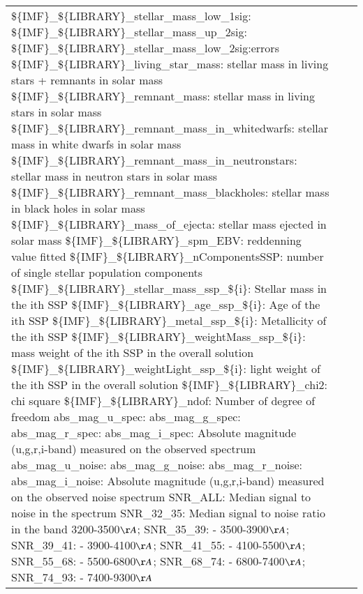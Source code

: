 \documentclass[onecolumn]{aa}
\begin{document}
\begin{table}
\begin{center}
\begin{tabular}{ L{3.5cm} L{4cm} L{11cm} }
\$\{IMF\}\_\$\{LIBRARY\}\_stellar\_mass\_low\_1sig:
\$\{IMF\}\_\$\{LIBRARY\}\_stellar\_mass\_up\_2sig: 
\$\{IMF\}\_\$\{LIBRARY\}\_stellar\_mass\_low\_2sig:errors \newline 
\$\{IMF\}\_\$\{LIBRARY\}\_living\_star\_mass: stellar mass in living stars + remnants in solar mass \newline 
\$\{IMF\}\_\$\{LIBRARY\}\_remnant\_mass: stellar mass in living stars in solar mass \newline 
\$\{IMF\}\_\$\{LIBRARY\}\_remnant\_mass\_in\_whitedwarfs: stellar mass in white dwarfs in solar mass \newline 
\$\{IMF\}\_\$\{LIBRARY\}\_remnant\_mass\_in\_neutronstars: stellar mass in neutron stars in solar mass \newline 
\$\{IMF\}\_\$\{LIBRARY\}\_remnant\_mass\_blackholes: stellar mass in black holes in solar mass \newline 
\$\{IMF\}\_\$\{LIBRARY\}\_mass\_of\_ejecta: stellar mass ejected in solar mass \newline 
\$\{IMF\}\_\$\{LIBRARY\}\_spm\_EBV: reddenning value fitted \newline 
\$\{IMF\}\_\$\{LIBRARY\}\_nComponentsSSP:         number of single stellar population components  \newline 
\$\{IMF\}\_\$\{LIBRARY\}\_stellar\_mass\_ssp\_\$\{i\}:  Stellar mass in the ith SSP  \newline 
\$\{IMF\}\_\$\{LIBRARY\}\_age\_ssp\_\$\{i\}:            Age of the ith SSP          \newline 
\$\{IMF\}\_\$\{LIBRARY\}\_metal\_ssp\_\$\{i\}:          Metallicity of the ith SSP   \newline 
\$\{IMF\}\_\$\{LIBRARY\}\_weightMass\_ssp\_\$\{i\}:     mass weight of the ith SSP in the overall solution \newline 
\$\{IMF\}\_\$\{LIBRARY\}\_weightLight\_ssp\_\$\{i\}:    light weight of the ith SSP in the overall solution \newline 
\$\{IMF\}\_\$\{LIBRARY\}\_chi2: chi square \newline 
\$\{IMF\}\_\$\{LIBRARY\}\_ndof: Number of degree of freedom \newline 
abs\_mag\_u\_spec: 
abs\_mag\_g\_spec: 
abs\_mag\_r\_spec: 
abs\_mag\_i\_spec: Absolute magnitude (u,g,r,i-band) measured on the observed spectrum \newline 
abs\_mag\_u\_noise:  
abs\_mag\_g\_noise:
abs\_mag\_r\_noise:
abs\_mag\_i\_noise: Absolute magnitude (u,g,r,i-band) measured on the observed noise spectrum \newline
SNR\_ALL: Median signal to noise in the spectrum \newline 
SNR\_32\_35: Median signal to noise ratio in the band 3200-3500$\AA$; 
SNR\_35\_39: - 3500-3900$\AA$;  
SNR\_39\_41: - 3900-4100$\AA$;  
SNR\_41\_55: - 4100-5500$\AA$;  
SNR\_55\_68: - 5500-6800$\AA$;  
SNR\_68\_74: - 6800-7400$\AA$;  
SNR\_74\_93: - 7400-9300$\AA$  \newline 


\end{tabular}
\end{center}
\end{table}
\end{document}
